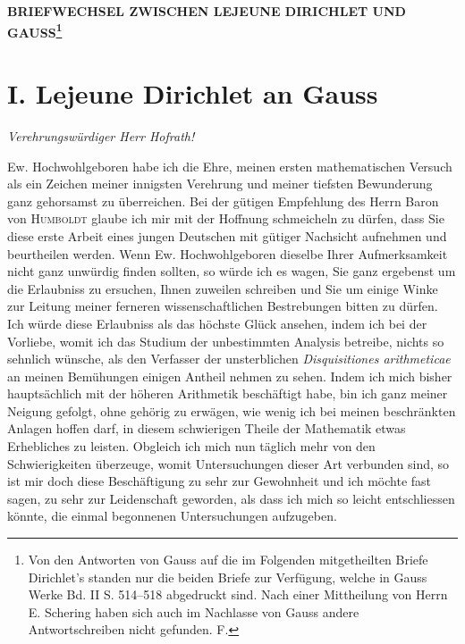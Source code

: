\documentclass[11pt]{article}
\newcommand{\scn}[1]{\textsc{#1}}
\begin{document}
\begin{center}
{\Large\bfseries BRIEFWECHSEL ZWISCHEN LEJEUNE DIRICHLET UND GAUSS\footnote{Von den Antworten von Gauss auf die im Folgenden mitgetheilten Briefe Dirichlet's standen nur die beiden Briefe zur Verfügung, welche in Gauss Werke Bd. II S. 514--518 abgedruckt sind. Nach einer Mittheilung von Herrn E. Schering haben sich auch im Nachlasse von Gauss andere Antwortschreiben nicht gefunden. F.}\par}
\vspace{0.8em}
\end{center}

\section*{I. Lejeune Dirichlet an Gauss}
\begin{center}\emph{Verehrungswürdiger Herr Hofrath!}\end{center}

Ew. Hochwohlgeboren habe ich die Ehre, meinen ersten mathematischen Versuch als ein Zeichen meiner innigsten Verehrung und meiner tiefsten Bewunderung ganz gehorsamst zu überreichen. Bei der gütigen Empfehlung des Herrn Baron von \scn{Humboldt} glaube ich mir mit der Hoffnung schmeicheln zu dürfen, dass Sie diese erste Arbeit eines jungen Deutschen mit gütiger Nachsicht aufnehmen und beurtheilen werden. Wenn Ew. Hochwohlgeboren dieselbe Ihrer Aufmerksamkeit nicht ganz unwürdig finden sollten, so würde ich es wagen, Sie ganz ergebenst um die Erlaubniss zu ersuchen, Ihnen zuweilen schreiben und Sie um einige Winke zur Leitung meiner ferneren wissenschaftlichen Bestrebungen bitten zu dürfen. Ich würde diese Erlaubniss als das höchste Glück ansehen, indem ich bei der Vorliebe, womit ich das Studium der unbestimmten Analysis betreibe, nichts so sehnlich wünsche, als den Verfasser der unsterblichen \emph{Disquisitiones arithmeticae} an meinen Bemühungen einigen Antheil nehmen zu sehen. Indem ich mich bisher hauptsächlich mit der höheren Arithmetik beschäftigt habe, bin ich ganz meiner Neigung gefolgt, ohne gehörig zu erwägen, wie wenig ich bei meinen beschränkten Anlagen hoffen darf, in diesem schwierigen Theile der Mathematik etwas Erhebliches zu leisten. Obgleich ich mich nun täglich mehr von den Schwierigkeiten überzeuge, womit Untersuchungen dieser Art verbunden sind, so ist mir doch diese Beschäftigung zu sehr zur Gewohnheit und ich möchte fast sagen, zu sehr zur Leidenschaft geworden, als dass ich mich so leicht entschliessen könnte, die einmal begonnenen Untersuchungen aufzugeben.
\end{document}
